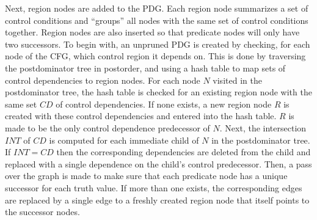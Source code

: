 Next, region nodes are added to the PDG. Each region node summarizes a set of control conditions and ``groups'' all nodes with the same set of control conditions together. Region nodes are also inserted so that predicate nodes will only have two successors. To begin with, an unpruned PDG is created by checking, for each node of the CFG, which control region it depends on. This is done by traversing the postdominator tree in postorder, and using a hash table to map sets of control dependencies to region nodes. For each node $N$ visited in the postdominator tree, the hash table is checked for an existing region node with the same set $CD$ of control dependencies. If none exists, a new region node $R$ is created with these control dependencies and entered into the hash table. $R$ is made to be the only control dependence predecessor of $N$. Next, the intersection $INT$ of $CD$ is computed for each immediate child of $N$ in the postdominator tree. If $INT=CD$ then the corresponding dependencies are deleted from the child and replaced with a single dependence on the child's control predecessor. Then, a pass over the graph is made to make sure that each predicate node has a unique successor for each truth value. If more than one exists, the corresponding edges are replaced by a single edge to a freshly created region node that itself points to the successor nodes.

